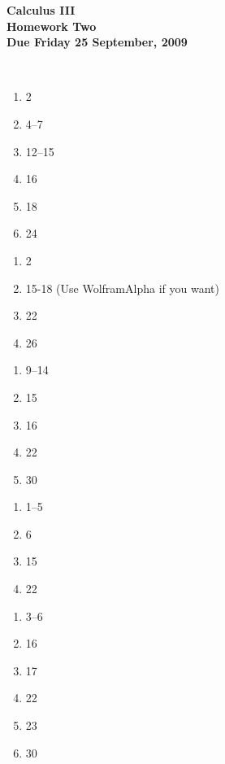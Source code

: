 \documentclass[12pt]{article}
\begin{document}
\pagestyle{empty}
 
\begin{center}
{\large {\bf Calculus III}}\\
\medskip
{\large {\bf Homework Two}}\\
\medskip
{ {\bf Due Friday 25 September, 2009}}\\
\end{center}

\hspace{2mm}\\


\begin{enumerate}
\setlength{\itemsep}{-1mm}
  \item 2
  \item 4--7
  \item 12--15
  \item 16
  \item 18
  \item 24

\end{enumerate}


\begin{enumerate}
\setlength{\itemsep}{-1mm}
  \item 2
  \item 15-18 (Use WolframAlpha if you want)
  \item 22
  \item 26

\end{enumerate}


\begin{enumerate}
\setlength{\itemsep}{-1mm}
  \item 9--14
  \item 15
  \item 16
  \item 22
  \item 30
\end{enumerate}

\begin{enumerate}
\setlength{\itemsep}{-1mm}
  \item 1--5
  \item 6
  \item 15
  \item 22
\end{enumerate}

\begin{enumerate}
\setlength{\itemsep}{-1mm}
  \item 3--6
  \item 16
  \item 17
  \item 22
  \item 23
  \item 30
\end{enumerate}
\end{document}
